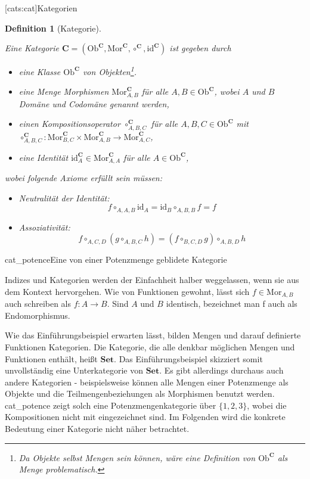 \documentclass[11pt, a4paper, bibgerm]{scrbook}
\newcommand\lsection{}
\newcommand\abb{}
\newcommand\fig{}
\newcommand\ato{\rightarrow} %
\newtheorem{defini}{Definition}
\newcommand{\defi}[2]{%
  \begin{defini}[#1]
    \label{def:#1}
    #2
  \end{defini}
}
\begin{document}
\lsection[cats:cat]{Kategorien}

\defi{Kategorie}{
Eine Kategorie $\mathbf{C} = (\mathrm{Ob}^\mathbf{C}, \mathrm{Mor}^\mathbf{C},
\circ^\mathbf{C}, \mathrm{id}^\mathbf{C})$ ist gegeben durch
\begin{itemize}
\item eine Klasse $\mathrm{Ob}^\mathbf{C}$ von Objekten\footnote{Da Objekte selbst Mengen
    sein können, wäre eine Definition von $\mathrm{Ob}^\mathbf{C}$ als Menge problematisch.}.
\item eine Menge Morphismen $\mathrm{Mor}^\mathbf{C}_{A,B}$ für alle $ A,B \in
  \mathrm{Ob}^\mathbf{C}$, wobei $A$ und $B$ Domäne und Codomäne genannt werden,
\item einen Kompositionsoperator $\circ^\mathbf{C}_{A,B,C}$ für alle $
  A,B,C \in \mathrm{Ob}^\mathbf{C}$ mit \\
  $\circ^\mathbf{C}_{A,B,C} : \mathrm{Mor}^\mathbf{C}_{B,C} \times
  \mathrm{Mor}^\mathbf{C}_{A,B} \rightarrow \mathrm{Mor}^\mathbf{C}_{A,C}$,
\item eine Identität $\mathrm{id}^\mathbf{C}_A \in \mathrm{Mor}^\mathbf{C}_{A,A}$ für alle $ A \in \mathrm{Ob}^\mathbf{C}$,
\end{itemize}
wobei folgende Axiome erfüllt sein müssen:
\begin{itemize}
\item Neutralität der Identität: $$f \circ_{A,A,B} \mathrm{id}_A = \mathrm{id}_B \circ_{A,B,B} f = f$$
\item Assoziativität:
  $$f \circ_{A,C,D} (g \circ_{A,B,C} h) = (f \circ_{B,C,D} g) \circ_{A,B,D}h$$
\end{itemize}
}

\fig{cat_potence}{Eine von einer Potenzmenge geblidete Kategorie}

Indizes und Kategorien werden der Einfachheit halber weggelassen, wenn
sie aus dem Kontext hervorgehen. Wie von Funktionen gewohnt, lässt sich
$f \in \mathrm{Mor}_{A,B}$ auch schreiben als $f : A \ato B$. Sind $A$
und $B$ identisch, bezeichnet man f auch als Endomorphismus.

Wie das Einführungsbeispiel erwarten lässt, bilden Mengen und darauf
definierte Funktionen Kategorien. Die Kategorie, die alle denkbar
möglichen Mengen und Funktionen enthält, heißt $\mathbf{Set}$. Das
Einführungsbeispiel skizziert somit unvollständig eine Unterkategorie
von $\mathbf{Set}$. Es gibt allerdings durchaus auch andere Kategorien -
beispielsweise können alle Mengen einer Potenzmenge als Objekte und die
Teilmengenbeziehungen als Morphismen benutzt werden. \abb{cat_potence}
zeigt solch eine Potenzmengenkategorie über $\{1,2,3\}$, wobei die
Kompositionen nicht mit eingezeichnet sind. Im Folgenden wird die
konkrete Bedeutung einer Kategorie nicht näher betrachtet.
\end{document}
